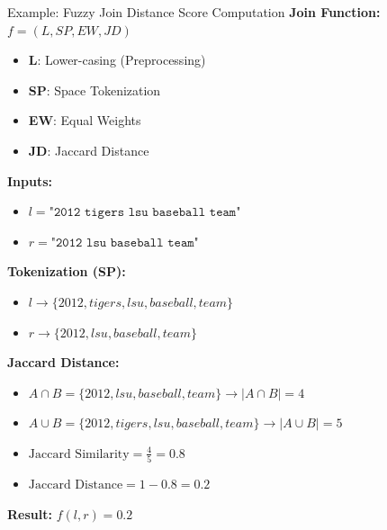 \documentclass[8pt]{beamer} %
\begin{document}
\begin{frame}{Example: Fuzzy Join Distance Score Computation}
	\textbf{Join Function:} $f = (L, SP, EW, JD)$
	\begin{itemize}
		\item \textbf{L}: Lower-casing (Preprocessing)
		\item \textbf{SP}: Space Tokenization
		\item \textbf{EW}: Equal Weights
		\item \textbf{JD}: Jaccard Distance
	\end{itemize}
	
	\vspace{1em}
	\textbf{Inputs:}
	\begin{itemize}
		\item $l = \texttt{"2012 tigers lsu baseball team"}$
		\item $r = \texttt{"2012 lsu baseball team"}$
	\end{itemize}
	
	\vspace{1em}
	\textbf{Tokenization (SP):}
	\begin{itemize}
		\item $l \rightarrow \{2012, tigers, lsu, baseball, team\}$
		\item $r \rightarrow \{2012, lsu, baseball, team\}$
	\end{itemize}
	
	\vspace{1em}
	\textbf{Jaccard Distance:}
	\begin{itemize}
		\item $A \cap B = \{2012, lsu, baseball, team\} \rightarrow |A \cap B| = 4$
		\item $A \cup B = \{2012, tigers, lsu, baseball, team\} \rightarrow |A \cup B| = 5$
		\item $\text{Jaccard Similarity} = \frac{4}{5} = 0.8$
		\item $\text{Jaccard Distance} = 1 - 0.8 = 0.2$
	\end{itemize}
	
	\vspace{1em}
	\textbf{Result:} $f(l, r) = 0.2$
\end{frame}
\end{document}
